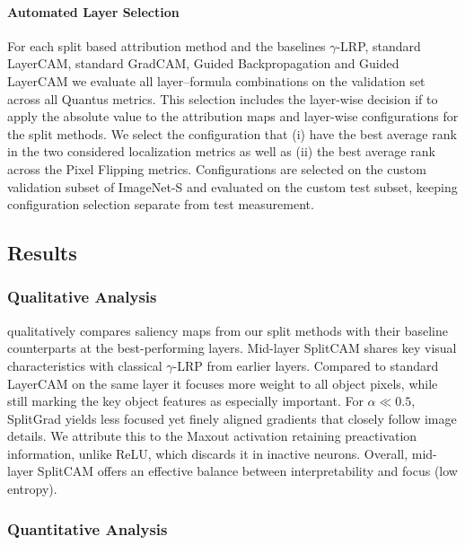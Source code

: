 \FloatBarrier

\paragraph{Automated Layer Selection}
For each split based attribution method and the baselines $\gamma$-LRP, standard LayerCAM, standard GradCAM, Guided Backpropagation and Guided LayerCAM we evaluate all layer–formula combinations on the validation set across all Quantus metrics.
This selection includes the layer-wise decision if to apply the absolute value to the attribution maps and layer-wise configurations for the split methods.
We select the configuration that (i) have the best average rank in the two considered localization metrics as well as (ii) the best average rank across the Pixel Flipping metrics.
Configurations are selected on the custom validation subset of ImageNet-S and evaluated on the custom test subset, keeping configuration selection separate from test measurement.

\subsection{Results}

\subsubsection{Qualitative Analysis}

 qualitatively compares saliency maps from our split methods with their baseline counterparts at the best-performing layers.
Mid-layer SplitCAM shares key visual characteristics with classical $\gamma$-LRP from earlier layers.
Compared to standard LayerCAM on the same layer it focuses more weight to all object pixels, while still marking the key object features as especially important.
For $\alpha \ll 0.5$, SplitGrad yields less focused yet finely aligned gradients that closely follow image details. We attribute this to the Maxout activation retaining preactivation information, unlike ReLU, which discards it in inactive neurons. 
Overall, mid-layer SplitCAM offers an effective balance between interpretability and focus (low entropy).

\subsubsection{Quantitative Analysis}



